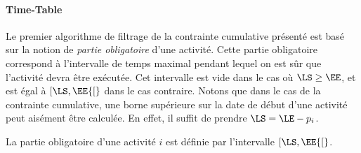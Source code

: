 \paragraph{Time-Table}
Le premier algorithme de filtrage de la contrainte cumulative
présenté est basé sur la notion de {\it partie obligatoire} d'une
activité. Cette partie obligatoire correspond à l'intervalle de temps
maximal pendant lequel on est sûr que l'activité devra être
exécutée. Cet intervalle est vide dans le cas où $\LS \ge \EE$, et est
égal à $[\LS,\EE{[}$ dans le cas contraire. Notons que dans le cas de la
contrainte cumulative, une borne supérieure sur la date de début d'une
activité peut aisément être calculée. En effet, il suffit de prendre
$\LS=\LE - p_i$. 


\begin{defi}
La partie obligatoire d'une activité $i$ est définie par l'intervalle
$[\LS,\EE{[}$.
\end{defi}

